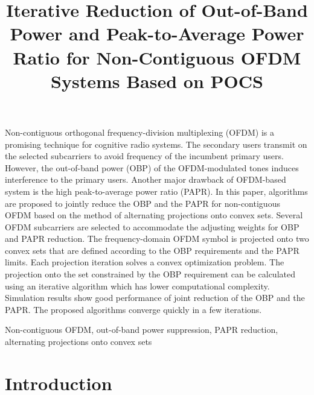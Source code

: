 \documentclass[paper]{ieice}
\title[Iterative Reduction of OBP and PAPR
Ratio Based on POCS]
      {Iterative Reduction of Out-of-Band Power and Peak-to-Average Power
Ratio for Non-Contiguous OFDM Systems Based on POCS}
\begin{document}
\maketitle

\begin{summary}
Non-contiguous orthogonal frequency-division multiplexing (OFDM) is a promising technique for cognitive radio systems.  The secondary users transmit on the selected subcarriers to avoid frequency of the incumbent primary users.  However, the out-of-band power (OBP) of the OFDM-modulated tones induces interference to the primary users.  Another major drawback of OFDM-based system is the high peak-to-average power ratio (PAPR).  In this paper, algorithms are proposed to jointly reduce the OBP and the PAPR for non-contiguous OFDM based on the method of alternating projections onto convex sets.  Several OFDM subcarriers are selected to accommodate the adjusting weights for OBP and PAPR reduction.  The frequency-domain OFDM symbol is projected onto two convex sets that are defined according to the OBP requirements and the PAPR limits. Each projection iteration solves a convex optimization problem. The projection onto the set constrained by the OBP requirement can be calculated using an iterative algorithm which has lower computational complexity. Simulation results show good performance of joint reduction of the OBP and the PAPR.  The proposed algorithms converge quickly in a few iterations.
\end{summary}
\begin{keywords}
Non-contiguous OFDM, out-of-band power suppression, PAPR reduction, alternating projections onto convex sets
\end{keywords}

\section{Introduction}\label{intro}
\end{document}
